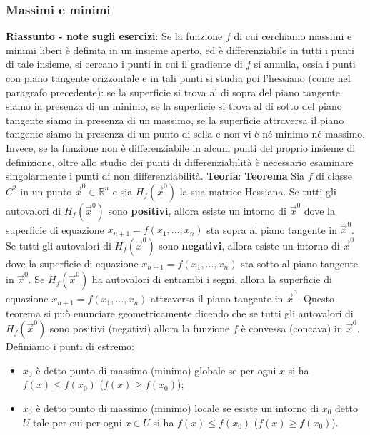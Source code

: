 \subsubsection{Massimi e minimi}
\textbf{Riassunto - note sugli esercizi}:\newline
Se la funzione $f$ di cui cerchiamo massimi e minimi liberi è definita in un insieme aperto, ed è differenziabile in tutti i punti di tale insieme, si cercano i punti in cui il gradiente di $f$ si annulla, ossia i punti con piano tangente orizzontale e in tali punti si studia poi l'hessiano (come nel paragrafo precedente): se la superficie si trova al di sopra del piano tangente siamo in presenza di un minimo, se la superficie si trova al di sotto del piano tangente siamo in presenza di un massimo, se la superficie attraversa il piano tangente siamo in presenza di un punto di sella e non vi è né minimo né massimo.\newline
Invece, se la funzione non è differenziabile in alcuni punti del proprio insieme di definizione, oltre allo studio dei punti di differenziabilità è necessario esaminare singolarmente i punti di non differenziabilità.\newline
\newline
\textbf{Teoria}:\newline
\textbf{Teorema} Sia $f$ di classe $C^2$ in un punto $\vec{x}^0 \in \mathbb{R}^n$ e sia $H_f (\vec{x}^0)$ la sua matrice Hessiana. Se tutti gli autovalori di $H_f(\vec{x}^0)$ sono \textbf{positivi}, allora esiste un intorno di $\vec{x}^0$ dove la superficie di equazione $x_{n+1} = f(x_1,\dots,x_n)$ sta sopra al piano tangente in $\vec{x}^0$. Se tutti gli autovalori di $H_f(\vec{x}^0)$ sono \textbf{negativi}, allora esiste un intorno di $\vec{x}^0$ dove la superficie di equazione $x_{n+1} = f(x_1,\dots,x_n)$ sta sotto al piano tangente in $\vec{x}^0$. Se $H_f(\vec{x}^0)$ ha autovalori di entrambi i segni, allora la superficie di equazione $x_{n+1} = f(x_1,\dots,x_n)$ attraversa il piano tangente in $\vec{x}^0$.\newline
\newline
Questo teorema si può enunciare geometricamente dicendo che se tutti gli autovalori di $H_f(\vec{x}^0)$  sono positivi (negativi) allora la funzione $f$ è convessa (concava) in $\vec{x}^0$.\newline
\newline
Definiamo i punti di estremo:
\begin{itemize}
    \item $x_0$ è detto punto di massimo (minimo) globale se per ogni $x$ si ha $f(x) \leq f(x_0)$ ($f(x) \geq f(x_0)$);
    \item $x_0$ è detto punto di massimo (minimo) locale se esiste un intorno di $x_0$ detto $U$ tale per cui per ogni $x \in U$ si ha $f(x) \leq f(x_0)$ ($f(x) \geq f(x_0)$).
\end{itemize}
